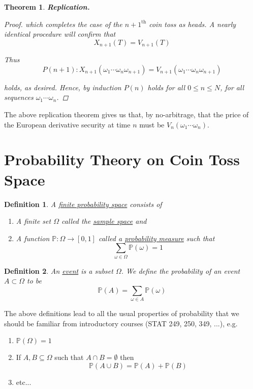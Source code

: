 \documentclass[12pt]{article}
\newtheorem{definition}{Definition}
\newtheorem{theorem}{Theorem}
\newlength\tindent
\renewcommand{\indent}{\hspace*{\tindent}}
\renewcommand{\P}{\mathbb P}
\begin{document}
\begin{theorem} {\bf Replication.}
\begin{proof}
which completes the case of the $n + 1^{\text{th}}$ coin toss as heads. A nearly identical procedure will confirm that 
\begin{equation*}
	X_{n + 1}(T) = V_{n + 1}(T)
\end{equation*}

Thus
\begin{equation*}
	P(n + 1): X_{n + 1}(\omega_1\cdots\omega_n\omega_{n + 1}) = V_{n + 1}(\omega_1\cdots\omega_n\omega_{n + 1})
\end{equation*}

holds, as desired. Hence, by induction $P(n)$ holds for all $0 \leq n \leq N$, for all sequences $\omega_1\cdots\omega_n$.
\end{proof}
\end{theorem}

\indent The above replication theorem gives us that, by no-arbitrage, that the price of the European derivative security at time $n$ must be $V_n(\omega_1\cdots\omega_n)$.

\section{Probability Theory on Coin Toss Space}

\begin{definition} A \underline{finite probability space} consists of
\begin{enumerate}
	\item A finite set $\Omega$ called the \underline{sample space} and
	\item A function $\P: \Omega \to [0,1]$ called a \underline{probability measure} such that
	\begin{equation*}
		\sum_{\omega\in\Omega} \P(\omega) = 1
	\end{equation*}
\end{enumerate}
\end{definition}

\begin{definition} An \underline{event} is a subset $\Omega$. We define the probability of an event $A \subset \Omega$ to be 
\begin{equation*}
	\P(A) = \sum_{\omega\in A} \P(\omega)
\end{equation*}
\end{definition}

\indent The above definitions lead to all the usual properties of probability that we should be familiar from introductory courses (STAT 249, 250, 349, ...), e.g.
\begin{enumerate}
	\item $\P(\Omega) = 1$
	\item If $A, B \subseteq \Omega$ such that $A \cap B = \emptyset$ then
	\begin{equation*}
		\P(A \cup B) = \P(A) + \P(B)
	\end{equation*}
	\item etc...
\end{enumerate}
\end{document}
